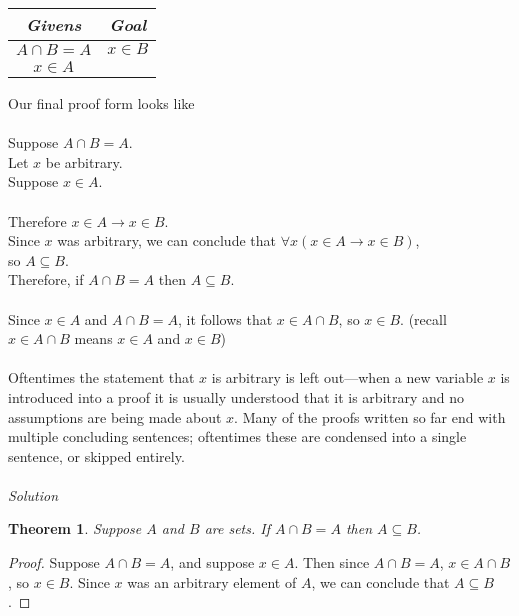 \documentclass{report}
\newtheorem*{theorem}{Theorem}
\theoremstyle{definition}
\begin{document}
\begin{center}
\begin{tabular}{c|c}
\textit{Givens}&\textit{Goal}\\
\hline
$A\cap B=A$&$x\in B$\\
$x\in A$&
\end{tabular}
\end{center}
Our final proof form looks like\\
\vspace{1mm}\\
\indent Suppose $A\cap B=A$.\\
\indent\indent Let $x$ be arbitrary.\\
\indent\indent\indent Suppose $x\in A$.\\
\indent\indent\indent{}\\
\indent\indent\indent Therefore $x\in A\to x\in B$.\\
\indent\indent Since $x$ was arbitrary, we can conclude that $\forall x(x\in A\to x\in B)$,\\
\indent\indent so $A\subseteq B$.\\
\indent Therefore, if $A\cap B=A$ then $A\subseteq B$.\\
\vspace{1mm}\\
Since $x\in A$ and $A\cap B=A$, it follows that $x\in A\cap B$, so $x\in B$. (recall $x\in A\cap B$ means $x\in A$ and $x\in B$)\\
\vspace{1mm}\\
Oftentimes the statement that $x$ is arbitrary is left out---when a new variable $x$ is introduced into a proof it is usually understood that it is arbitrary and no assumptions are being made 
about $x$. Many of the proofs written so far end with multiple concluding sentences; oftentimes these are condensed into a single sentence, or skipped entirely.\\
\vspace{1mm}\\
\textit{Solution}
\begin{theorem}
Suppose $A$ and $B$ are sets. If $A\cap B=A$ then $A\subseteq B$.
\end{theorem}
\begin{proof}
Suppose $A\cap B=A$, and suppose $x\in A$. Then since $A\cap B=A$, $x\in A\cap B$, so $x\in B$. Since $x$ was an arbitrary element of $A$, we can conclude that $A\subseteq B$.
\end{proof}
\newpage
\end{document}
